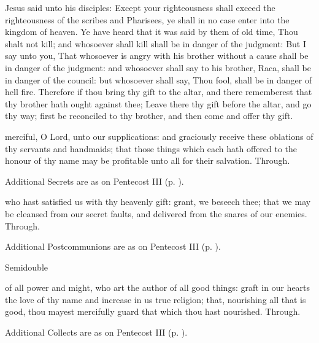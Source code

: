  Jesus said unto his disciples: Except your righteousness shall exceed the righteousness of the scribes and Pharisees, ye shall in no case enter into the kingdom of heaven. Ye have heard that it was said by them of old time, Thou shalt not kill; and whosoever shall kill shall be in danger of the judgment: But I say unto you, That whosoever is angry with his brother without a cause shall be in danger of the judgment: and whosoever shall say to his brother, Raca, shall be in danger of the council: but whosoever shall say, Thou fool, shall be in danger of hell fire. Therefore if thou bring thy gift to the altar, and there rememberest that thy brother hath ought against thee; Leave there thy gift before the altar, and go thy way; first be reconciled to thy brother, and then come and offer thy gift.

\secret
{} merciful, O Lord, unto our supplications: and graciously receive these oblations of thy servants and handmaids; that those things which each hath offered to the honour of thy name may be profitable unto all for their salvation. Through.
\begin{rubric}
    Additional Secrets are as on Pentecost III (p. \pageref{PentecostIII}).
\end{rubric}

\postcommunion
{} who hast satisfied us with thy heavenly gift: grant, we beseech thee; that we may be cleansed from our secret faults, and delivered from the snares of our enemies. Through.
\begin{rubric}
    Additional Postcommunions are as on Pentecost III (p. \pageref{PentecostIII}).
\end{rubric}

\begin{inhead}
    {Semidouble}
\end{inhead}

\collect
{} of all power and might, who art the author of all good things: graft in our hearts the love of thy name and increase in us true religion; that, nourishing all that is good, thou mayest mercifully guard that which thou hast nourished. Through.
\begin{rubric}
    Additional Collects are as on Pentecost III (p. \pageref{PentecostIII}).
\end{rubric}

